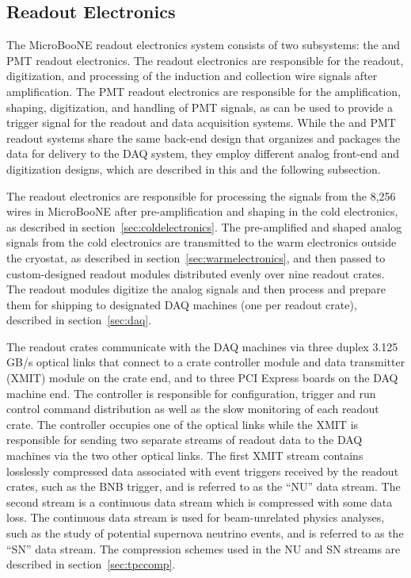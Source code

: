 \subsection{Readout Electronics}
\label{sec:readoutelectronics}
The MicroBooNE readout electronics system consists of two subsystems: the \lartpc and PMT readout electronics. The \lartpc readout electronics are responsible for the readout, digitization, and processing of the induction and collection wire signals after amplification. The PMT readout electronics are responsible for the amplification, shaping, digitization, and handling of PMT signals, as can be used to provide a trigger signal for the readout and data acquisition systems. While the \lartpc and PMT readout systems share the same back-end design that organizes and packages the data for delivery to the DAQ system, they employ different analog front-end and digitization designs, which are described in this and the following subsection.

The \lartpc readout electronics are responsible for processing the signals from the 8,256 wires in MicroBooNE after pre-amplification and shaping in the cold electronics, as described in section~\ref{sec:coldelectronics}.  The pre-amplified and shaped analog signals from the cold electronics are transmitted to the warm electronics outside the cryostat, as described in section~\ref{sec:warmelectronics}, and then passed to custom-designed \lartpc readout modules distributed evenly over nine readout crates.  The readout modules digitize the analog signals and then process and prepare them for shipping to designated DAQ machines (one per readout crate), described in section~\ref{sec:daq}. 

The \lartpc readout crates communicate with the DAQ machines via three duplex 3.125 GB/s optical links that connect to a crate controller module and data transmitter (XMIT) module on the crate end, and to three PCI Express boards on the DAQ machine end. The controller is responsible for configuration, trigger and run control command distribution as well as the slow monitoring of each readout crate. The controller occupies one of the optical links while the XMIT is responsible for sending two separate streams of readout data to the DAQ machines via the two other optical links. The first XMIT stream contains losslessly compressed \lartpc data associated with event triggers received by the \lartpc readout crates, such as the BNB trigger, and is referred to as the ``NU'' data stream. The second stream is a continuous \lartpc data stream which is compressed with some data loss. The continuous data stream is used for beam-unrelated physics analyses, such as the study of potential supernova neutrino events, and is referred to as the ``SN'' data stream. The compression schemes used in the NU and SN streams are described in section~\ref{sec:tpccomp}.

